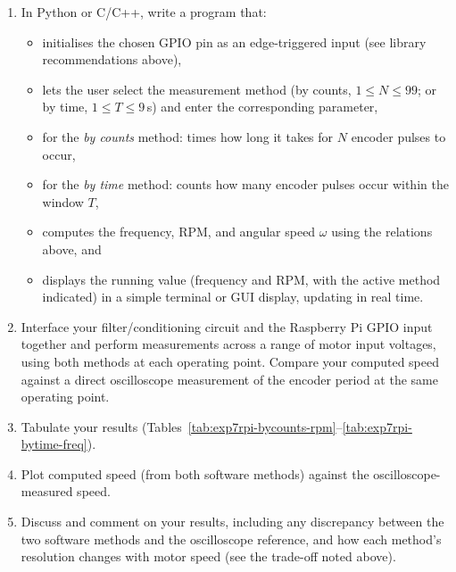 \begin{procedure}
  \begin{enumerate}
    \item In Python or C/C++, write a program that:
          \begin{itemize}
            \item initialises the chosen GPIO pin as an edge-triggered input (see library recommendations above),
            \item lets the user select the measurement method (by counts, $1 \leq N \leq 99$; or by time, $1 \leq T \leq 9$\,s) and enter the corresponding parameter, \newpage
            \item for the \emph{by counts} method: times how long it takes for $N$ encoder pulses to occur,
            \item for the \emph{by time} method: counts how many encoder pulses occur within the window $T$,
            \item computes the frequency, RPM, and angular speed $\omega$ using the relations above, and
            \item displays the running value (frequency and RPM, with the active method indicated) in a simple terminal or GUI display, updating in real time.
          \end{itemize}
    \item Interface your filter/conditioning circuit and the Raspberry Pi GPIO input together and perform measurements across a range of motor input voltages, using both methods at each operating point. Compare your computed speed against a direct oscilloscope measurement of the encoder period at the same operating point.
    \item Tabulate your results (Tables~\ref{tab:exp7rpi-bycounts-rpm}--\ref{tab:exp7rpi-bytime-freq}).
    \item Plot computed speed (from both software methods) against the oscilloscope-measured speed.
    \item Discuss and comment on your results, including any discrepancy between the two software methods and the oscilloscope reference, and how each method's resolution changes with motor speed (see the trade-off noted above).
  \end{enumerate}


\end{procedure}
